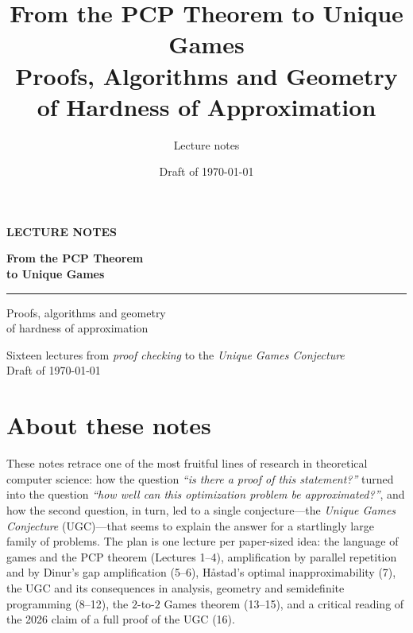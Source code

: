\documentclass[11pt,a4paper,oneside]{book}
\title{From the PCP Theorem to Unique Games\\[4pt]
  \Large Proofs, Algorithms and Geometry of Hardness of Approximation}
\author{Lecture notes}
\date{Draft of \today}
\begin{document}
\frontmatter

\begin{titlepage}
  \centering
  \vspace*{3.2cm}
  {\sffamily\color{accent}\large\bfseries LECTURE NOTES\par}
  \vspace{1.2cm}
  {\sffamily\bfseries\fontsize{30}{36}\selectfont From the PCP Theorem\\to Unique Games\par}
  \vspace{0.8cm}
  {\color{accent}\rule{0.55\textwidth}{1.2pt}\par}
  \vspace{0.8cm}
  {\sffamily\Large Proofs, algorithms and geometry\\of hardness of approximation\par}
  \vfill
  {\sffamily\small\color{softgray}
   Sixteen lectures from \emph{proof checking} to the \emph{Unique Games Conjecture}\\[2pt]
   Draft of \today\par}
  \vspace{1.5cm}
\end{titlepage}

\chapter*{About these notes}

These notes retrace one of the most fruitful lines of research in theoretical computer
science: how the question \emph{``is there a proof of this statement?''} turned into the
question \emph{``how well can this optimization problem be approximated?''}, and how the
second question, in turn, led to a single conjecture---the \emph{Unique Games
Conjecture} (UGC)---that seems to explain the answer for a startlingly large family of
problems.  The plan is one lecture per paper-sized idea: the language of games and the PCP theorem
(Lectures 1--4), amplification by parallel repetition and by Dinur's gap amplification (5--6),
Håstad's optimal inapproximability (7), the UGC and its consequences in analysis, geometry and
semidefinite programming (8--12), the $2$-to-$2$ Games theorem (13--15), and a critical reading
of the 2026 claim of a full proof of the UGC (16).
\end{document}
